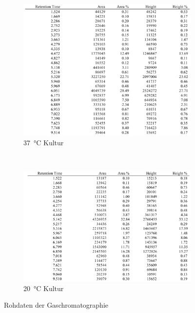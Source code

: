 \documentclass[a4paper,english]{scrreprt}
\begin{document}
\begin{figure}
	\centering
	\begin{subfigure}{.45\textwidth}
		\includegraphics[width=\linewidth]{img/gc_37_roh.png}
		\caption{\SI{37}{\celsius} Kultur}
		\label{fig:gc_37_roh}
	\end{subfigure}
	~
	\begin{subfigure}{.45\textwidth}
		\includegraphics[width=\linewidth]{img/gc_20_roh.png}
		\caption{\SI{20}{\celsius} Kultur}
		\label{fig:gc_20_roh}
	\end{subfigure}
	\caption{Rohdaten der Gaschromatographie}
	\label{fig:gc_roh}
\end{figure}
\end{document}
